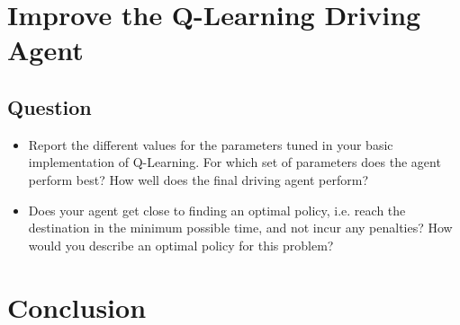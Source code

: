 \documentclass[twoside,openright,titlepage,numbers=noenddot,headinclude,%
               footinclude=true,cleardoublepage=empty,abstractoff,BCOR=5mm,%
               paper=a4,fontsize=11pt,ngerman,american]{scrreprt}
\numberwithin{theorem}{chapter}
\numberwithin{definition}{chapter}
\numberwithin{algorithm}{chapter}
\numberwithin{figure}{chapter}
\numberwithin{table}{chapter}
\numberwithin{equation}{chapter}
\begin{document}
%
%

\chapter*{Improve the Q-Learning Driving Agent}

\section*{Question}

\begin{itemize}
\item Report the different values for the parameters tuned in your basic implementation of Q-Learning. For which set of parameters does the agent perform best? How well does the final driving agent perform?
\item Does your agent get close to finding an optimal policy, i.e. reach the destination in the minimum possible time, and not incur any penalties? How would you describe an optimal policy for this problem?

\end{itemize}

%
%

\chapter*{Conclusion}
\end{document}
